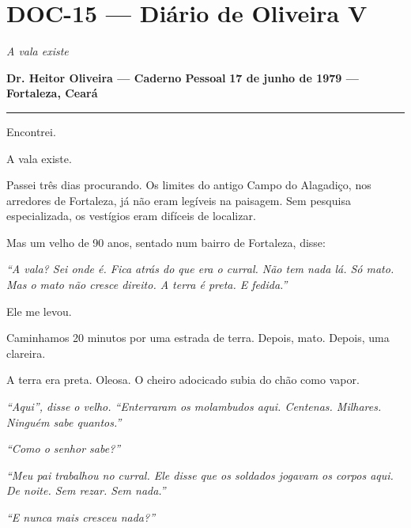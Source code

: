 \section*{\textbf{DOC-15} --- Diário de Oliveira V}

\noindent \textit{A vala existe}

\noindent \textbf{Dr. Heitor Oliveira --- Caderno Pessoal}
\textbf{17 de junho de 1979 --- Fortaleza, Ceará}

\vspace{0.5em}\noindent\rule{\textwidth}{0.5pt}\vspace{0.5em}

\noindent Encontrei.

\noindent A vala existe.

\noindent Passei três dias procurando. Os limites do antigo Campo do Alagadiço, nos arredores de Fortaleza, já não eram legíveis na paisagem. Sem pesquisa especializada, os vestígios eram difíceis de localizar.

\noindent Mas um velho de 90 anos, sentado num bairro de Fortaleza, disse:

\noindent \textit{\textquotedblleft{}A vala? Sei onde é. Fica atrás do que era o curral. Não tem nada lá. Só mato. Mas o mato não cresce direito. A terra é preta. E fedida.\textquotedblright{}}

\noindent Ele me levou.

\noindent Caminhamos 20 minutos por uma estrada de terra. Depois, mato. Depois, uma clareira.

\noindent A terra era preta. Oleosa. O cheiro adocicado subia do chão como vapor.

\noindent \textit{\textquotedblleft{}Aqui\textquotedblright{}\textit{, disse o velho. }\textquotedblleft{}Enterraram os molambudos aqui. Centenas. Milhares. Ninguém sabe quantos.\textquotedblright{}}

\noindent \textit{\textquotedblleft{}Como o senhor sabe?\textquotedblright{}}

\noindent \textit{\textquotedblleft{}Meu pai trabalhou no curral. Ele disse que os soldados jogavam os corpos aqui. De noite. Sem rezar. Sem nada.\textquotedblright{}}

\noindent \textit{\textquotedblleft{}E nunca mais cresceu nada?\textquotedblright{}}

